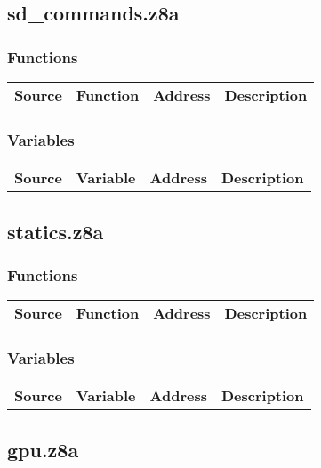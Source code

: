 \subsection{sd\_commands.z8a}
\subsubsection{Functions}
\begin{tabular}{rllp{7cm}}
 \textbf{Source}&\textbf{Function}&\textbf{Address}&\textbf{Description}\\
\end{tabular}

\subsubsection{Variables}
\begin{tabular}{rllp{7cm}}
 \textbf{Source}&\textbf{Variable}&\textbf{Address}&\textbf{Description}\\
\end{tabular}

\subsection{statics.z8a}
\subsubsection{Functions}
\begin{tabular}{rllp{7cm}}
 \textbf{Source}&\textbf{Function}&\textbf{Address}&\textbf{Description}\\
\end{tabular}

\subsubsection{Variables}
\begin{tabular}{rllp{7cm}}
 \textbf{Source}&\textbf{Variable}&\textbf{Address}&\textbf{Description}\\
\end{tabular}

\subsection{gpu.z8a}
